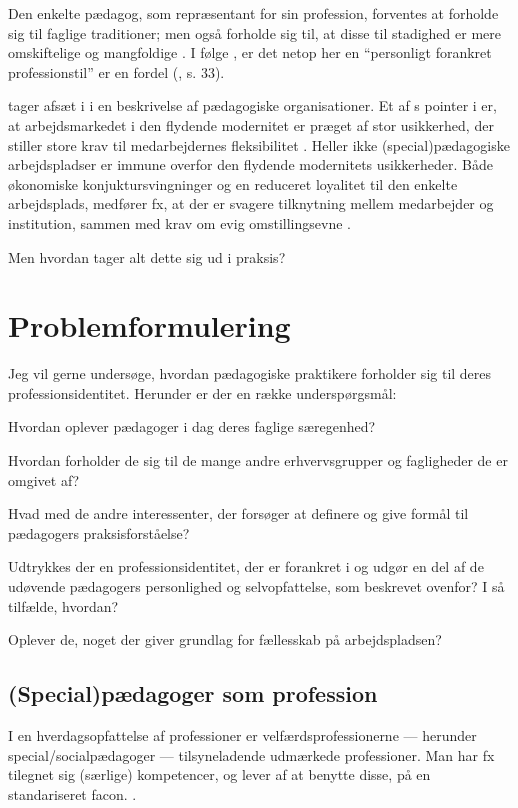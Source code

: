 Den enkelte pædagog, som repræsentant for sin profession, forventes at forholde sig til faglige traditioner; men også forholde sig til, at disse til stadighed er mere omskiftelige og mangfoldige \autocite[s.33]{hansbolKonstruktionAfProfessionel2008}. I følge \citeauthor{hansbolKonstruktionAfProfessionel2008}, er det netop her en “personligt forankret professionstil” er en fordel (\citeyear{hansbolKonstruktionAfProfessionel2008}, s. 33).

\citeauthor{kofodOrganisationOgLedelse2016} tager afsæt i \citeauthor{baumanLiquidModernity2000} i en beskrivelse af pædagogiske organisationer. 
Et af \citeauthor{baumanLiquidModernity2000}s pointer i  er, at arbejdsmarkedet i den flydende modernitet er præget af stor usikkerhed, der stiller store krav til medarbejdernes fleksibilitet \autocite[s. 147; 151]{baumanLiquidModernity2000}.
Heller ikke (special)pædagogiske arbejdspladser er immune overfor den flydende modernitets usikkerheder.
Både økonomiske konjuktursvingninger og en reduceret loyalitet til den enkelte arbejdsplads, medfører fx, at der er svagere tilknytning mellem medarbejder og institution, sammen med krav om evig omstillingsevne \autocite[s. 166f]{kofodOrganisationOgLedelse2016}.

Men hvordan tager alt dette sig ud i praksis?

\section{Problemformulering}
Jeg vil gerne undersøge, hvordan pædagogiske praktikere forholder sig til deres professionsidentitet.
Herunder er der en række underspørgsmål:

Hvordan oplever pædagoger i dag deres faglige særegenhed?

Hvordan forholder de sig til de mange andre erhvervsgrupper og fagligheder de er omgivet af?

Hvad med de andre interessenter, der forsøger at definere og give formål til pædagogers praksisforståelse?

Udtrykkes der en professionsidentitet, der er forankret i og udgør en del af de udøvende pædagogers personlighed og selvopfattelse, som beskrevet ovenfor?
I så tilfælde, hvordan?

Oplever de, noget der giver grundlag for fællesskab på arbejdspladsen?

\subsection{(Special)pædagoger som profession}
I en hverdagsopfattelse af professioner er velfærdsprofessionerne — herunder special/socialpædagoger — tilsyneladende udmærkede professioner.
Man har fx tilegnet sig (særlige) kompetencer, og lever af at benytte disse, på en standariseret facon. \autocite[ss. 443-445]{frederiksenVelfaerdsprofessionerMellemOmsorg2017}.

